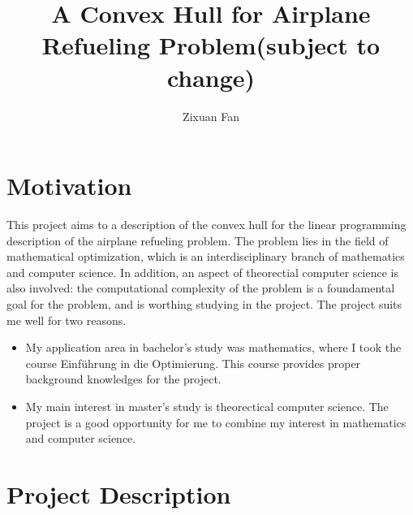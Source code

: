 \documentclass[12pt,letterpaper]{article}
\title{A Convex Hull for Airplane Refueling Problem(subject to change)}
\author{Zixuan Fan}
\begin{document}
\maketitle

\section{Motivation}
This project aims to a description of the convex hull for the linear programming description of the 
airplane refueling problem. The problem lies in the field of mathematical optimization, 
which is an interdisciplinary branch of mathematics and computer science. In addition, 
an aspect of theorectial computer science is also involved: the computational complexity of the problem 
is a foundamental goal for the problem, and is worthing studying in the project. The project suits me well for two reasons.
\begin{itemize}
    \item My application area in bachelor's study was mathematics, where I took the course Einführung in die Optimierung. This course provides proper background knowledges for the project. 
    \item My main interest in master's study is theorectical computer science. The project is a good opportunity for me to combine my interest in mathematics and computer science.
\end{itemize}

\section{Project Description}
\end{document}
